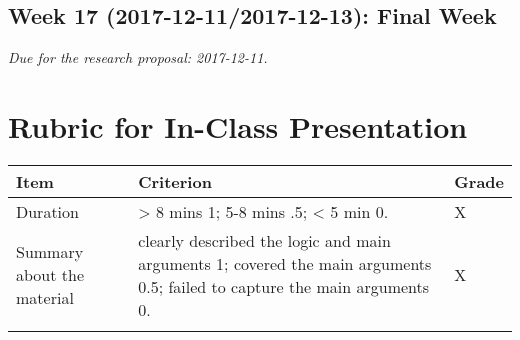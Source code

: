 \documentclass[11pt,]{article}
\theoremstyle{definition}
\theoremstyle{definition}
\theoremstyle{remark}
\begin{document}
\subsection{Week 17 (2017-12-11/2017-12-13): Final
Week}\label{week-17-2017-12-112017-12-13-final-week}

\emph{Due for the research proposal: 2017-12-11.}

\clearpage

\section{Rubric for In-Class
Presentation}\label{rubric-for-in-class-presentation}

\begin{longtable}[]{@{}lll@{}}
\toprule
\begin{minipage}[b]{0.16\columnwidth}\raggedright\strut
Item\strut
\end{minipage} & \begin{minipage}[b]{0.72\columnwidth}\raggedright\strut
Criterion\strut
\end{minipage} & \begin{minipage}[b]{0.04\columnwidth}\raggedright\strut
Grade\strut
\end{minipage}\tabularnewline
\midrule
\endhead
\begin{minipage}[t]{0.16\columnwidth}\raggedright\strut
Duration\strut
\end{minipage} & \begin{minipage}[t]{0.72\columnwidth}\raggedright\strut
\textgreater{} 8 mins 1; 5-8 mins .5; \textless{} 5 min 0.\strut
\end{minipage} & \begin{minipage}[t]{0.04\columnwidth}\raggedright\strut
X\strut
\end{minipage}\tabularnewline
\begin{minipage}[t]{0.16\columnwidth}\raggedright\strut
Summary about the material\strut
\end{minipage} & \begin{minipage}[t]{0.72\columnwidth}\raggedright\strut
clearly described the logic and main arguments 1; covered the main
arguments 0.5; failed to capture the main arguments 0.\strut
\end{minipage} & \begin{minipage}[t]{0.04\columnwidth}\raggedright\strut
X\strut
\end{minipage}\tabularnewline
\begin{minipage}[t]{0.16\columnwidth}\raggedright\strut

\end{minipage}
\end{longtable}
\end{document}

